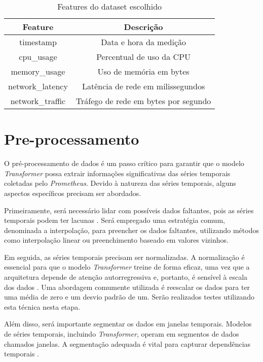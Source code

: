 \begin{table}[h!]
    \centering
    \begin{tabular}{|c|c|}
        \hline
        \textbf{Feature} & \textbf{Descrição} \\
        \hline
        timestamp & Data e hora da medição \\
        \hline
        cpu\_usage & Percentual de uso da CPU \\
       

 \hline
        memory\_usage & Uso de memória em bytes \\
        \hline
        network\_latency & Latência de rede em milissegundos \\
        \hline
        network\_traffic & Tráfego de rede em bytes por segundo \\
        \hline
    \end{tabular}
    \caption{Features do dataset escolhido}
    \label{tab:dataset_features}
\end{table}


\section{Pre-processamento}

O pré-processamento de dados é um passo crítico para garantir que o modelo \textit{Transformer} possa extrair informações significativas das séries temporais coletadas pelo \textit{Prometheus}. Devido à natureza das séries temporais, alguns aspectos específicos precisam ser abordados.

Primeiramente, será necessário lidar com possíveis dados faltantes, pois as séries temporais podem ter lacunas%
. Será empregado uma estratégia comum, denominada a interpolação, para preencher os dados faltantes, utilizando métodos como interpolação linear ou preenchimento baseado em valores vizinhos.

Em seguida, as séries temporais precisam ser normalizadas. A normalização é essencial para que o modelo \textit{Transformer} treine de forma eficaz, uma vez que a arquitetura depende de atenção autorregressiva e, portanto, é sensível à escala dos dados \cite{vaswani2017attention}. Uma abordagem comumente utilizada é reescalar os dados para ter uma média de zero e um desvio padrão de um. Serão realizados testes utilizando esta técnica nesta etapa.

Além disso, será importante segmentar os dados em janelas temporais. Modelos de séries temporais, incluindo \textit{Transformer}, operam em segmentos de dados chamados janelas. A segmentação adequada é vital para capturar dependências temporais \cite{bai2018empirical}.

